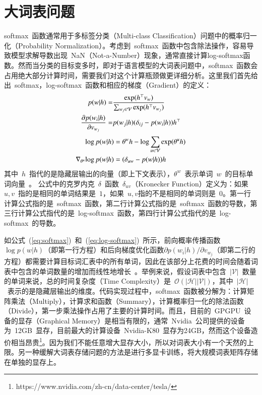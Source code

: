 \section{大词表问题}
softmax~函数通常用于多标签分类（Multi-class Classification）问题中的概率归一化（Probability Normalization）。考虑到~softmax~函数中包含除法操作，容易导致模型求解导数出现~NaN（Not-a-Number）现象，通常直接计算log-softmax函数。然而当分类的目标变多时，即对于语言模型的大词表问题中，softmax~函数会占用绝大部分计算时间，需要我们对这个计算瓶颈做更详细分析。这里我们首先给出~softmax，log-softmax~函数和相应的梯度（Gradient）的定义：
\begin{equation}\label{eq:softmax}
\setlength{\abovedisplayskip}{10pt}
\setlength{\belowdisplayskip}{10pt}
\begin{split}
p(w|h)=&\frac{\exp(h^\top v_{w})}{\sum_{w_j\in \mathcal{V}}{\exp(h^\top v_{w_j} )}} \\
\frac{\partial p(w_i|h)}{\partial v_{w_j}}=&p(w_j|h)(\delta_{ij}-p(w_i|h))h^\top\\
\end{split}
\end{equation}
\begin{equation}
\setlength{\abovedisplayskip}{10pt}
\setlength{\belowdisplayskip}{10pt}
\label{eq:log-softmax}
\begin{split}
\log p(w|h) &= \theta^w h-\log \sum_{u\in \mathcal{V}}{\exp(\theta^u h)}\\
\nabla_{\theta^u}{\log p(w|h)}&= (\delta_{uw}-p(w|h))h
\end{split}
\end{equation}
其中~$h$~指代的是隐藏层输出的向量（即上下文表示），$\theta^w$~表示单词~$w$~的目标单词向量~。
公式中的克罗内克~$\delta$~函数~$\delta_{uv}$（Kronecker Function）定义为：如果~$u,v$~指的是相同的单词结果是~$1$，如果~$u,v$指的不是相同的单词则是~$0$。第一行计算公式指的是~softmax~函数，第二行计算公式指的是~softmax~函数的导数，第三行计算公式指代的是~log-softmax~函数，第四行计算公式指代的是~log-softmax~的导数。


如公式~(\ref{eq:softmax})~和~(\ref{eq:log-softmax})~所示，前向概率传播函数~$\log p(w|h)$（即第一行方程）和后向梯度优化函数${\partial p(w_i|h)}/{\partial v_{w_j}}$（即第二行的方程）都需要计算目标词汇表中的所有单词，因此在该部分上花费的时间会随着词表中包含的单词数量的增加而线性地增长~。举例来说，假设词表中包含~$\mathcal{|V|}$~数量的单词来说，总的时间复杂度（Time Complexity）是~$\mathcal{O}(\mathcal{|H||V|})$，其中~$\mathcal{|H|}$~表示的是隐藏层输出的维度。代码实现过程中，softmax~函数被分解为：计算矩阵乘法（Multiply），计算求和函数（Summary），计算概率归一化的除法函数（Divide），第一步乘法操作占用了主要的计算时间。而且，目前的~GPGPU~设备的显存（Graphical Memory）是相当有限的，通常~Nvidia~公司提供的设备为~12GB~显存，目前最大的计算设备~Nvidia-K80~显存为24GB，然而这个设备造价相当昂贵\footnote{https://www.nvidia.com/zh-cn/data-center/tesla/}。因为我们不能任意增大显存大小，所以对词表大小有一个天然的上限。另一种缓解大词表存储问题的方法是进行多显卡训练，将大规模词表矩阵存储在单独的显存上。


